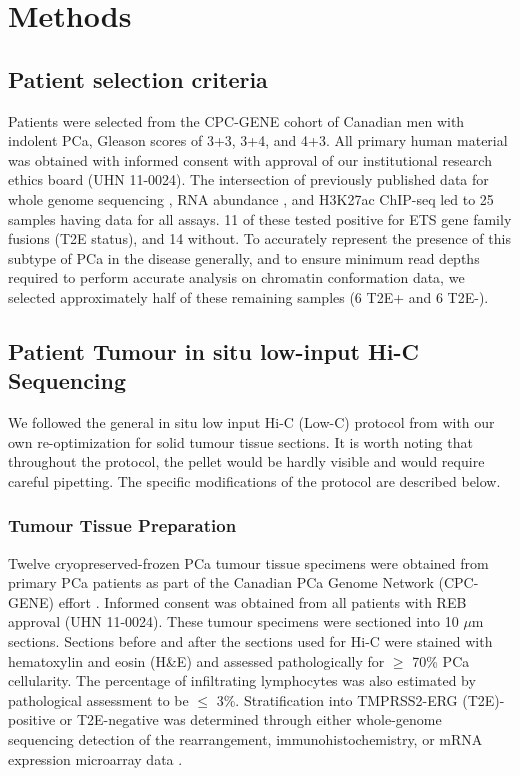 \section{Methods}

\subsection{Patient selection criteria}

Patients were selected from the CPC-GENE cohort of Canadian men with indolent PCa, Gleason scores of 3+3, 3+4, and 4+3.
All primary human material was obtained with informed consent with approval of our institutional research ethics board (UHN 11-0024).
The intersection of previously published data for whole genome sequencing \cite{fraserGenomicHallmarksLocalized2017}, RNA abundance \cite{chenWidespreadFunctionalRNA2019}, and H3K27ac ChIP-seq \cite{kronTMPRSS2ERGFusion2017} led to 25 samples having data for all assays.
11 of these tested positive for ETS gene family fusions (T2E status), and 14 without.
To accurately represent the presence of this subtype of PCa in the disease generally, and to ensure minimum read depths required to perform accurate analysis on chromatin conformation data, we selected approximately half of these remaining samples (6 T2E+ and 6 T2E-).

\subsection{Patient Tumour in situ low-input Hi-C Sequencing}

We followed the general in situ low input Hi-C (Low-C) protocol from \cite{diazChromatinConformationAnalysis2018} with our own re-optimization for solid tumour tissue sections.
It is worth noting that throughout the protocol, the pellet would be hardly visible and would require careful pipetting.
The specific modifications of the protocol are described below.

\subsubsection{Tumour Tissue Preparation}

Twelve cryopreserved-frozen PCa tumour tissue specimens were obtained from primary PCa patients as part of the Canadian PCa Genome Network (CPC-GENE) effort \cite{fraserGenomicHallmarksLocalized2017}.
Informed consent was obtained from all patients with REB approval (UHN 11-0024).
These tumour specimens were sectioned into 10 $\mu$m sections.
Sections before and after the sections used for Hi-C were stained with hematoxylin and eosin (H&E) and assessed pathologically for $\ge$ 70\% PCa cellularity.
The percentage of infiltrating lymphocytes was also estimated by pathological assessment to be $\le$ 3\%.
Stratification into TMPRSS2-ERG (T2E)-positive or T2E-negative was determined through either whole-genome sequencing detection of the rearrangement, immunohistochemistry, or mRNA expression microarray data \cite{fraserGenomicHallmarksLocalized2017}.

